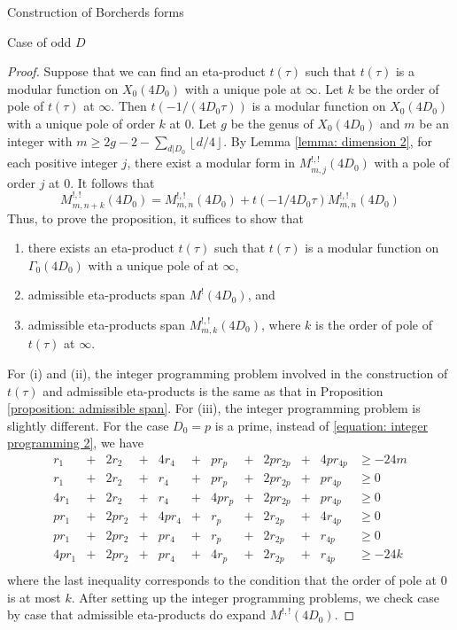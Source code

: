 \documentclass{amsart}
\newcounter{lemma}
\theoremstyle{definition}
\def\gauss#1{\left\lfloor #1\right\rfloor}
\begin{document}
\begin{section}{Construction of Borcherds forms}
\begin{subsection}{Case of odd $D$}
\begin{proof} Suppose that we can find an eta-product
  $t(\tau)$ such that $t(\tau)$ is a modular function on $X_0(4D_0)$
  with a unique pole at $\infty$. Let $k$ be the order of pole of
  $t(\tau)$ at $\infty$. Then $t(-1/(4D_0\tau))$ is a modular function
  on $X_0(4D_0)$ with a unique pole of order $k$ at $0$. Let $g$ be
  the genus of $X_0(4D_0)$ and $m$ be an integer with $m\ge
  2g-2-\sum_{d|D_0}\gauss{d/4}$. By Lemma \ref{lemma: dimension 2},
  for each positive integer $j$, there exist a modular form in
  $M^{!,!}_{m,j}(4D_0)$ with a pole of order $j$ at $0$. It follows that
  $$
    M_{m,n+k}^{!,!}(4D_0)=M_{m,n}^{!,!}(4D_0)+t(-1/4D_0\tau)
    M_{m,n}^{!,!}(4D_0)
  $$
  Thus, to prove the proposition, it suffices to show that
  \begin{enumerate}
  \item[(i)] there exists an eta-product $t(\tau)$ such that $t(\tau)$ is a modular
    function on $\Gamma_0(4D_0)$ with a unique pole of at $\infty$,
  \item[(ii)] admissible eta-products span $M^!(4D_0)$, and
  \item[(iii)] admissible eta-products span $M^{!,!}_{m,k}(4D_0)$, where $k$
    is the order of pole of $t(\tau)$ at $\infty$.
  \end{enumerate}
  For (i) and (ii), the integer programming problem involved in the
  construction of $t(\tau)$ and admissible eta-products is the same as
  that in Proposition \ref{proposition: admissible span}. For (iii),
  the integer programming problem is slightly different. For the case
  $D_0=p$ is a prime, instead of \eqref{equation: integer programming
  2}, we have
  \begin{equation*}
  \begin{array}{rcrcrcrcrcrl}
  r_1&+&2r_2&+&4r_4&+&pr_p&+&2pr_{2p}&+&4pr_{4p}&\ge -24m \\
  r_1&+&2r_2&+&r_4&+&pr_p&+&2pr_{2p}&+&pr_{4p}&\ge 0 \\
  4r_1&+&2r_2&+&r_4&+&4pr_p&+&2pr_{2p}&+&pr_{4p}&\ge 0\\
  pr_1&+&2pr_2&+&4pr_4&+&r_p&+&2r_{2p}&+&4r_{4p}&\ge 0\\
  pr_1&+&2pr_2&+&pr_4&+&r_p&+&2r_{2p}&+&r_{4p}&\ge 0\\
  4pr_1&+&2pr_2&+&pr_4&+&4r_p&+&2r_{2p}&+&r_{4p}&\ge -24k\\
  \end{array}
  \end{equation*}
  where the last inequality corresponds to the condition that the
  order of pole at $0$ is at most $k$. After setting up the integer
  programming problems, we check case by case that admissible
  eta-products do expand $M^{!,!}(4D_0)$.


\end{proof}
\end{subsection}
\end{section}
\end{document}
